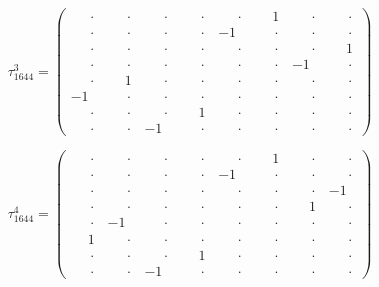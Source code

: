 \documentclass[
  10pt,
]{article}
\begin{document}
\[
\tau_{1644}^{3} = \left(\begin{array}{rrrr|rrrr}
\phantom{-}\cdot & \phantom{-}\cdot & \phantom{-}\cdot & \phantom{-}\cdot & \phantom{-}\cdot & \phantom{-}1 & \phantom{-}\cdot & \phantom{-}\cdot \\[-1.8pt]
\phantom{-}\cdot & \phantom{-}\cdot & \phantom{-}\cdot & \phantom{-}\cdot & -1 & \phantom{-}\cdot & \phantom{-}\cdot & \phantom{-}\cdot \\[-1.8pt]
\phantom{-}\cdot & \phantom{-}\cdot & \phantom{-}\cdot & \phantom{-}\cdot & \phantom{-}\cdot & \phantom{-}\cdot & \phantom{-}\cdot & \phantom{-}1 \\[-1.8pt]
\phantom{-}\cdot & \phantom{-}\cdot & \phantom{-}\cdot & \phantom{-}\cdot & \phantom{-}\cdot & \phantom{-}\cdot & -1 & \phantom{-}\cdot \\[-1.8pt]
\hline
\phantom{-}\cdot & \phantom{-}1 & \phantom{-}\cdot & \phantom{-}\cdot & \phantom{-}\cdot & \phantom{-}\cdot & \phantom{-}\cdot & \phantom{-}\cdot \\[-1.8pt]
-1 & \phantom{-}\cdot & \phantom{-}\cdot & \phantom{-}\cdot & \phantom{-}\cdot & \phantom{-}\cdot & \phantom{-}\cdot & \phantom{-}\cdot \\[-1.8pt]
\phantom{-}\cdot & \phantom{-}\cdot & \phantom{-}\cdot & \phantom{-}1 & \phantom{-}\cdot & \phantom{-}\cdot & \phantom{-}\cdot & \phantom{-}\cdot \\[-1.8pt]
\phantom{-}\cdot & \phantom{-}\cdot & -1 & \phantom{-}\cdot & \phantom{-}\cdot & \phantom{-}\cdot & \phantom{-}\cdot & \phantom{-}\cdot
\end{array}\right)
\]

\[
\tau_{1644}^{4} = \left(\begin{array}{rrrr|rrrr}
\phantom{-}\cdot & \phantom{-}\cdot & \phantom{-}\cdot & \phantom{-}\cdot & \phantom{-}\cdot & \phantom{-}1 & \phantom{-}\cdot & \phantom{-}\cdot \\[-1.8pt]
\phantom{-}\cdot & \phantom{-}\cdot & \phantom{-}\cdot & \phantom{-}\cdot & -1 & \phantom{-}\cdot & \phantom{-}\cdot & \phantom{-}\cdot \\[-1.8pt]
\phantom{-}\cdot & \phantom{-}\cdot & \phantom{-}\cdot & \phantom{-}\cdot & \phantom{-}\cdot & \phantom{-}\cdot & \phantom{-}\cdot & -1 \\[-1.8pt]
\phantom{-}\cdot & \phantom{-}\cdot & \phantom{-}\cdot & \phantom{-}\cdot & \phantom{-}\cdot & \phantom{-}\cdot & \phantom{-}1 & \phantom{-}\cdot \\[-1.8pt]
\hline
\phantom{-}\cdot & -1 & \phantom{-}\cdot & \phantom{-}\cdot & \phantom{-}\cdot & \phantom{-}\cdot & \phantom{-}\cdot & \phantom{-}\cdot \\[-1.8pt]
\phantom{-}1 & \phantom{-}\cdot & \phantom{-}\cdot & \phantom{-}\cdot & \phantom{-}\cdot & \phantom{-}\cdot & \phantom{-}\cdot & \phantom{-}\cdot \\[-1.8pt]
\phantom{-}\cdot & \phantom{-}\cdot & \phantom{-}\cdot & \phantom{-}1 & \phantom{-}\cdot & \phantom{-}\cdot & \phantom{-}\cdot & \phantom{-}\cdot \\[-1.8pt]
\phantom{-}\cdot & \phantom{-}\cdot & -1 & \phantom{-}\cdot & \phantom{-}\cdot & \phantom{-}\cdot & \phantom{-}\cdot & \phantom{-}\cdot
\end{array}\right)
\]
\end{document}
